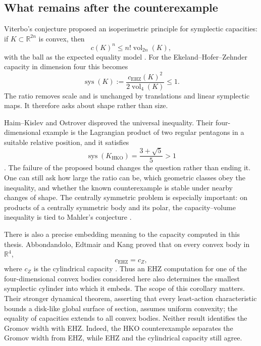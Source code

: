 
\subsection{What remains after the counterexample}

Viterbo's conjecture proposed an isoperimetric principle for symplectic
capacities: if \(K\subset\mathbb R^{2n}\) is convex, then
\[
  c(K)^n\leq n!\operatorname{vol}_{2n}(K),
\]
with the ball as the expected equality model \cite{Viterbo2000}.  For the
Ekeland--Hofer--Zehnder capacity in dimension four this becomes
\[
  \operatorname{sys}(K)
  :=\frac{c_{\mathrm{EHZ}}(K)^2}{2\operatorname{vol}_4(K)}\leq 1.
\]
The ratio removes scale and is unchanged by translations and linear
symplectic maps.  It therefore asks about shape rather than size.

Haim--Kislev and Ostrover disproved the universal inequality.  Their
four-dimensional example is the Lagrangian product of two regular pentagons
in a suitable relative position, and it satisfies
\[
  \operatorname{sys}(K_{\mathrm{HKO}})
  =\frac{3+\sqrt5}{5}>1
\]
\cite[Theorem~1.3 and Proposition~1.4]{HaimKislevOstrover2026}.  The failure
of the proposed bound changes the question rather than ending it.  One can
still ask how large the ratio can be, which geometric classes obey the
inequality, and whether the known counterexample is stable under nearby
changes of shape.  The centrally symmetric problem is especially important:
on products of a centrally symmetric body and its polar, the capacity--volume
inequality is tied to Mahler's conjecture \cite{ArtsteinAvidanKarasevOstrover2014}.

There is also a precise embedding meaning to the capacity computed in this
thesis.  Abbondandolo, Edtmair and Kang proved that on every convex body in
\(\mathbb R^4\),
\[
  c_{\mathrm{EHZ}}=c_Z,
\]
where \(c_Z\) is the cylindrical capacity
\cite[Corollary~1]{AbbondandoloEdtmairKang2024}.  Thus an EHZ computation for
one of the four-dimensional convex bodies considered here also determines
the smallest symplectic cylinder into which it embeds.  The scope of this
corollary matters.  Their stronger dynamical theorem, asserting that every
least-action characteristic bounds a disk-like global surface of section,
assumes uniform convexity; the equality of capacities extends to all convex
bodies.  Neither result identifies the Gromov width with EHZ.  Indeed, the
HKO counterexample separates the Gromov width from EHZ, while EHZ and the
cylindrical capacity still agree.

